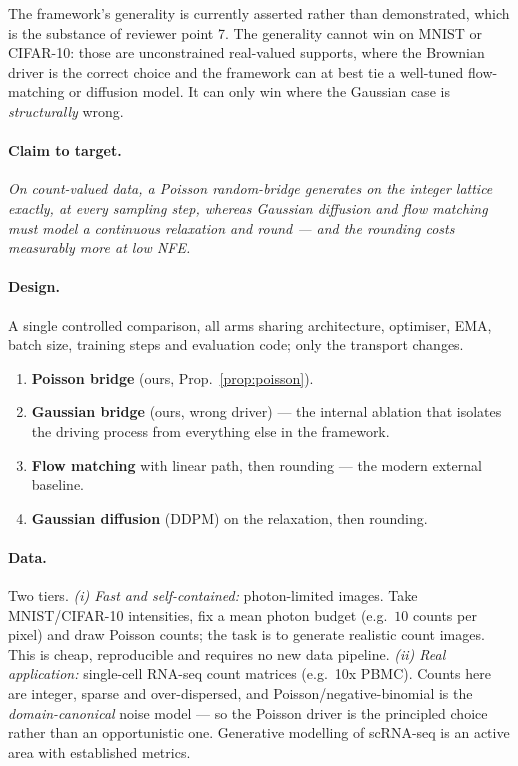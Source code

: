 \documentclass[11pt,a4paper]{article}
\begin{document}
The framework's generality is currently asserted rather than demonstrated, which is
the substance of reviewer point 7. The generality cannot win on MNIST or CIFAR-10:
those are unconstrained real-valued supports, where the Brownian driver is the
correct choice and the framework can at best tie a well-tuned flow-matching or
diffusion model. It can only win where the Gaussian case is \emph{structurally}
wrong.

\paragraph{Claim to target.}
\emph{On count-valued data, a Poisson random-bridge generates on the integer lattice
exactly, at every sampling step, whereas Gaussian diffusion and flow matching must
model a continuous relaxation and round --- and the rounding costs measurably more
at low NFE.}

\paragraph{Design.} A single controlled comparison, all arms sharing architecture,
optimiser, EMA, batch size, training steps and evaluation code; only the transport
changes.
\begin{enumerate}
\item \textbf{Poisson bridge} (ours, Prop.~\ref{prop:poisson}).
\item \textbf{Gaussian bridge} (ours, wrong driver) --- the internal ablation that
isolates the driving process from everything else in the framework.
\item \textbf{Flow matching} with linear path, then rounding --- the modern external
baseline.
\item \textbf{Gaussian diffusion} (DDPM) on the relaxation, then rounding.
\end{enumerate}

\paragraph{Data.} Two tiers.
\emph{(i) Fast and self-contained:} photon-limited images. Take MNIST/CIFAR-10
intensities, fix a mean photon budget (e.g.\ $10$ counts per pixel) and draw Poisson
counts; the task is to generate realistic count images. This is cheap, reproducible
and requires no new data pipeline.
\emph{(ii) Real application:} single-cell RNA-seq count matrices (e.g.\ 10x PBMC).
Counts here are integer, sparse and over-dispersed, and Poisson/negative-binomial is
the \emph{domain-canonical} noise model --- so the Poisson driver is the principled
choice rather than an opportunistic one. Generative modelling of scRNA-seq is an
active area with established metrics.
\end{document}
